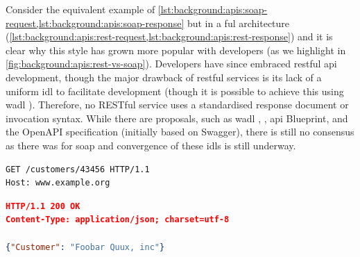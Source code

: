 \noindent
Consider the equivalent example of \cref{lst:background:apis:soap-request,lst:background:apis:soap-response} but in a ful architecture (\cref{lst:background:apis:rest-request,lst:background:apis:rest-response}) and it is clear why this style has grown more popular with developers (as we highlight in \cref{fig:background:apis:rest-vs-soap}). Developers have since embraced \gls{rest}ful \gls{api} development, though the major drawback of \gls{rest}ful services is its lack of a uniform \gls{idl} to facilitate development (though it is possible to achieve this using \gls{wadl} \citep{Mandel:2008ww}).  Therefore, no RESTful service uses a standardised response document or invocation syntax. While there are proposals, such as \gls{wadl} \citep{Hadley:2006vv}, , \gls{api} Blueprint, and the OpenAPI specification (initially based on Swagger), there is still no consensus as there was for \gls{soap} and convergence of these \glspl{idl} is still underway.

\begin{samepage}
\begin{lstlisting}[label=lst:background:apis:rest-request,caption={[An example RESTful request]An equivalent \glsac{http} consumer request to that of \cref{lst:background:apis:soap-request}, but using \gls{rest}. Source: \citep{Ballinger:2014aa}.}]
GET /customers/43456 HTTP/1.1
Host: www.example.org
\end{lstlisting}
\begin{lstlisting}[language=json,label=lst:background:apis:rest-response,caption={[An example RESTful response]The \gls{rest} \glsac{http} service provider response for \cref{lst:background:apis:rest-request}. Source: \citep{Ballinger:2014aa}.}]
HTTP/1.1 200 OK
Content-Type: application/json; charset=utf-8

{"Customer": "Foobar Quux, inc"}
\end{lstlisting}
\end{samepage}

